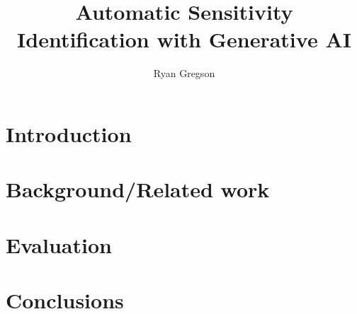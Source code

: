 \documentclass{mpaper}
\begin{document}
\title{Automatic Sensitivity Identification with Generative AI}
\author{Ryan Gregson}

\maketitle



\begin{abstract}
%
\end{abstract}

\section{Introduction}


\section{Background/Related work}





\section{Evaluation}


\section{Conclusions}


%

\end{document}
